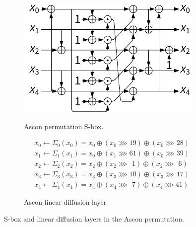 \documentclass[11pt,twoside]{article}
\begin{document}
\begin{figure}
  \centering
  \begin{subfigure}[b]{0.4\textwidth}
    \includegraphics[scale=1]{assets/sbox.pdf} \\
    \caption{Ascon permutation S-box.}
    \label{fig:2a}
  \end{subfigure}
  \hspace*{0.01\textwidth}
  \begin{subfigure}[B]{0.55\textwidth}
    \begin{align*}
       & x_0 \leftarrow \Sigma_{0}(x_0) = x_0 \oplus (x_0 \ggg 19) \oplus (x_0 \ggg 28)          \\
       & x_1 \leftarrow \Sigma_{1}(x_1) = x_0 \oplus (x_1 \ggg 61) \oplus (x_0 \ggg 39)          \\
       & x_2 \leftarrow \Sigma_{2}(x_2) = x_2 \oplus (x_2 \ggg \ \, 1) \oplus (x_2 \ggg \ \,  6) \\
       & x_3 \leftarrow \Sigma_{3}(x_3) = x_3 \oplus (x_3 \ggg 10) \oplus (x_3 \ggg 17)          \\
       & x_4 \leftarrow \Sigma_{4}(x_4) = x_4 \oplus (x_4 \ggg \ \,  7) \oplus (x_4 \ggg 41)
    \end{align*}
    \vspace*{0.07\textwidth}
    \caption{Ascon linear diffusion layer}
    \label{fig:2b}
  \end{subfigure}
  \caption{S-box and linear diffusion layers in the Ascon permutation.}
  \label{fig:2}
\end{figure}
\end{document}
